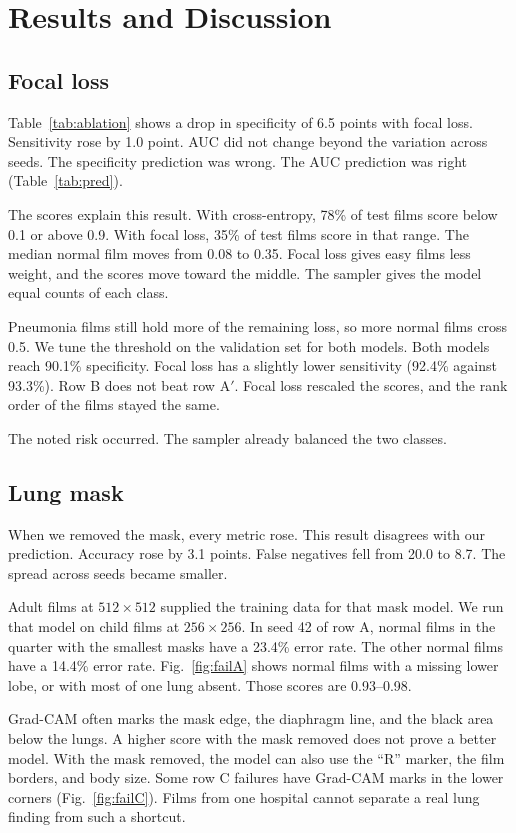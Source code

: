 \documentclass[conference]{IEEEtran}
\begin{document}
\section{Results and Discussion}
\subsection{Focal loss}
Table~\ref{tab:ablation} shows a drop in specificity of 6.5 points with focal loss. Sensitivity rose by 1.0 point. AUC did not change beyond the variation across seeds. The specificity prediction was wrong. The AUC prediction was right (Table~\ref{tab:pred}).

The scores explain this result. With cross-entropy, 78\% of test films score below 0.1 or above 0.9. With focal loss, 35\% of test films score in that range. The median normal film moves from 0.08 to 0.35. Focal loss gives easy films less weight, and the scores move toward the middle. The sampler gives the model equal counts of each class.

Pneumonia films still hold more of the remaining loss, so more normal films cross 0.5. We tune the threshold on the validation set for both models. Both models reach 90.1\% specificity. Focal loss has a slightly lower sensitivity (92.4\% against 93.3\%). Row B does not beat row A$'$. Focal loss rescaled the scores, and the rank order of the films stayed the same.

The noted risk occurred. The sampler already balanced the two classes.

\subsection{Lung mask}
When we removed the mask, every metric rose. This result disagrees with our prediction. Accuracy rose by 3.1 points. False negatives fell from 20.0 to 8.7. The spread across seeds became smaller.

Adult films at $512\times512$ supplied the training data for that mask model. We run that model on child films at $256\times256$. In seed 42 of row A, normal films in the quarter with the smallest masks have a 23.4\% error rate. The other normal films have a 14.4\% error rate. Fig.~\ref{fig:failA} shows normal films with a missing lower lobe, or with most of one lung absent. Those scores are 0.93--0.98.

Grad-CAM often marks the mask edge, the diaphragm line, and the black area below the lungs. A higher score with the mask removed does not prove a better model. With the mask removed, the model can also use the ``R'' marker, the film borders, and body size. Some row C failures have Grad-CAM marks in the lower corners (Fig.~\ref{fig:failC}). Films from one hospital cannot separate a real lung finding from such a shortcut.
\end{document}
